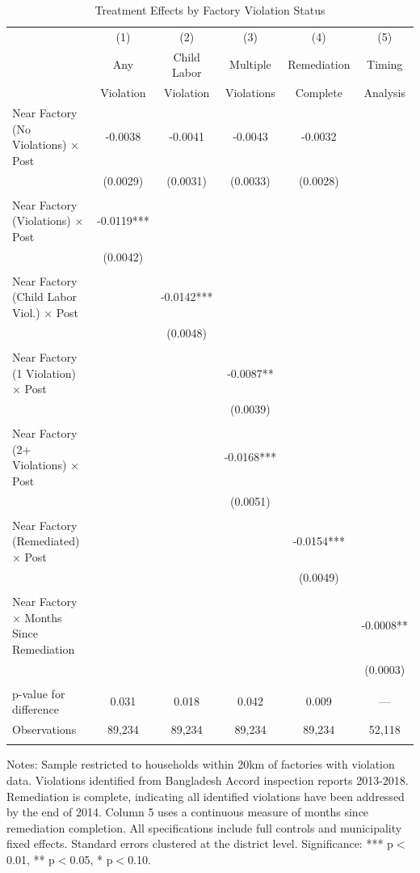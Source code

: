 \documentclass[12pt]{article}
\begin{document}
\begin{table}[H]
\centering
\caption{Treatment Effects by Factory Violation Status}
\label{tab:violations}
\begin{threeparttable}
\begin{tabular}{lccccc}
\toprule
& (1) & (2) & (3) & (4) & (5) \\
& Any & Child Labor & Multiple & Remediation & Timing \\
& Violation & Violation & Violations & Complete & Analysis \\
\midrule
Near Factory (No Violations) × Post & -0.0038 & -0.0041 & -0.0043 & -0.0032 & \\
& (0.0029) & (0.0031) & (0.0033) & (0.0028) & \\
& & & & & \\
Near Factory (Violations) × Post & -0.0119*** & & & & \\
& (0.0042) & & & & \\
& & & & & \\
Near Factory (Child Labor Viol.) × Post & & -0.0142*** & & & \\
& & (0.0048) & & & \\
& & & & & \\
Near Factory (1 Violation) × Post & & & -0.0087** & & \\
& & & (0.0039) & & \\
& & & & & \\
Near Factory (2+ Violations) × Post & & & -0.0168*** & & \\
& & & (0.0051) & & \\
& & & & & \\
Near Factory (Remediated) × Post & & & & -0.0154*** & \\
& & & & (0.0049) & \\
& & & & & \\
Near Factory × Months Since Remediation & & & & & -0.0008** \\
& & & & & (0.0003) \\
\\
\midrule
p-value for difference & 0.031 & 0.018 & 0.042 & 0.009 & --- \\
Observations & 89,234 & 89,234 & 89,234 & 89,234 & 52,118 \\
\\
\bottomrule
\end{tabular}
\begin{tablenotes}
\footnotesize
\item Notes: Sample restricted to households within 20km of factories with violation data. Violations identified from Bangladesh Accord inspection reports 2013-2018. Remediation is complete, indicating all identified violations have been addressed by the end of 2014. Column 5 uses a continuous measure of months since remediation completion. All specifications include full controls and municipality fixed effects. Standard errors clustered at the district level. Significance: *** p$<$0.01, ** p$<$0.05, * p$<$0.10.
\end{tablenotes}
\end{threeparttable}
\end{table}
\end{document}
